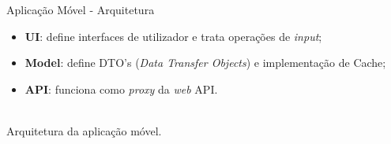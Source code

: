 \begin{frame}{Aplicação Móvel - Arquitetura}
	
\vspace*{-4em}
	
\begin{itemize}
	\item \textbf{UI}: define interfaces de utilizador e trata operações de \textit{input};
	\item \textbf{Model}: define DTO's (\textit{Data Transfer Objects}) e implementação de Cache;
	\item \textbf{API}: funciona como \textit{proxy} da \textit{web} API.
\end{itemize}	

\centering
{}\\

{\small Arquitetura da aplicação móvel.}

\end{frame}